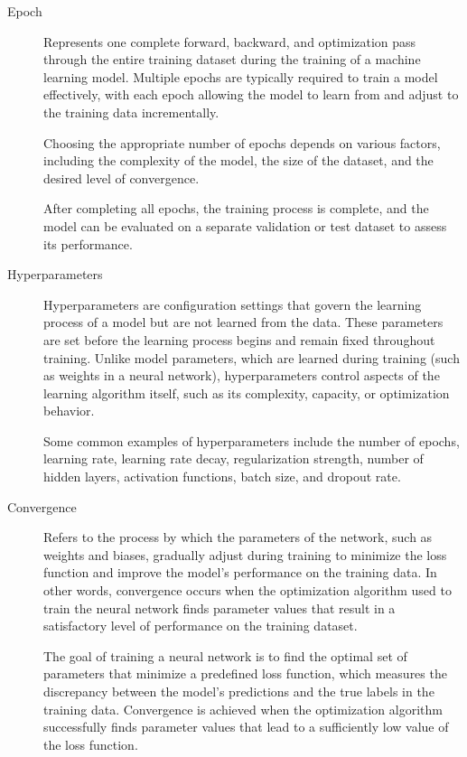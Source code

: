 \documentclass[a4paper]{report}
\begin{document}
\begin{description}
\item[Epoch] 
Represents one complete forward, backward, and optimization pass through the entire training dataset during the training of a machine learning model. Multiple epochs are typically required to train a model effectively, with each epoch allowing the model to learn from and adjust to the training data incrementally.

Choosing the appropriate number of epochs depends on various factors, including the complexity of the model, the size of the dataset, and the desired level of convergence. 

After completing all epochs, the training process is complete, and the model can be evaluated on a separate validation or test dataset to assess its performance.

\item[Hyperparameters]
Hyperparameters are configuration settings that govern the learning process of a model but are not learned from the data. These parameters are set before the learning process begins and remain fixed throughout training. Unlike model parameters, which are learned during training (such as weights in a neural network), hyperparameters control aspects of the learning algorithm itself, such as its complexity, capacity, or optimization behavior.

Some common examples of hyperparameters include the number of epochs, learning rate, learning rate decay, regularization strength, number of hidden layers, activation functions, batch size, and dropout rate.

\item[Convergence]
Refers to the process by which the parameters of the network, such as weights and biases, gradually adjust during training to minimize the loss function and improve the model's performance on the training data. In other words, convergence occurs when the optimization algorithm used to train the neural network finds parameter values that result in a satisfactory level of performance on the training dataset.

The goal of training a neural network is to find the optimal set of parameters that minimize a predefined loss function, which measures the discrepancy between the model's predictions and the true labels in the training data. Convergence is achieved when the optimization algorithm successfully finds parameter values that lead to a sufficiently low value of the loss function.


\end{description}
\end{document}
